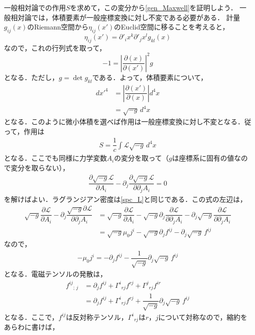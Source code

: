 \documentclass[a4paper]{ltjsreport}
\begin{document}
一般相対論での作用$S$を求めて，この変分から\eqref{gen_Maxwell}を証明しよう．
一般相対論では，体積要素が一般座標変換に対し不変である必要がある．
計量$g_{ij}(x)$のRiemann空間から$\eta_{ij}(x')$のEuclid空間に移ることを考えると，
\[
\eta_{ij}(x')=\partial'_i{x^k}\partial'_j{x^l}g_{kl}(x)
\]
なので，これの行列式を取って，
\[ - 1=\left|\dfrac{\partial(x)}{\partial(x')}\right|^2g\]
となる．ただし，$g=\det{g_{kl}}$である．よって，体積要素について，
\begin{align*}
  dx'^4 &= \left|\dfrac{\partial(x')}{\partial(x)}\right|d^4x\\
  &= \sqrt{ - g}\,d^4x
\end{align*}
となる．このように微小体積を選べば作用は一般座標変換に対し不変となる．従って，作用は
\begin{align}
  S = \dfrac{1}{c}\int{}\mathcal{L}\sqrt{ - g}\,d^4x
\end{align}
となる．ここでも同様に力学変数$A_i$の変分を取って（$g$は座標系に固有の値なので変分を取らない），
\begin{align}
  \dfrac{\partial{\sqrt{ - g}\mathcal{L}}}{\partial{}A_i} - \partial_j\dfrac{\partial{\sqrt{ - g}\mathcal{L}}}{\partial\partial_jA_i}=0
\end{align}
を解けばよい．ラグランジアン密度は\eqref{spc_L}と同じである．この式の左辺は，
\begin{align*}
  \sqrt{ - g}\dfrac{\partial{\mathcal{L}}}{\partial{}A_i} - \partial_j\dfrac{\sqrt{ - g}\partial{\mathcal{L}}}{\partial\partial_jA_i}
  &= \sqrt{ - g}\dfrac{\partial{\mathcal{L}}}{\partial{}A_i} - \sqrt{ - g}\partial_j\dfrac{\partial{\mathcal{L}}}{\partial\partial_jA_i}
   - \partial_j\sqrt{ - g}\dfrac{\partial{\mathcal{L}}}{\partial\partial_jA_i}\\
  &= \sqrt{ - g}\mu_0j^i - \sqrt{ - g}\partial_jf^{ij} - \partial_j\sqrt{ - g}\,f^{ij}
\end{align*}
なので，
\begin{align}
   - \mu_0j^i= - \partial_jf^{ij} - \dfrac{1}{\sqrt{ - g}}\partial_j\sqrt{ - g}\,f^{ij}\label{Sgen_Maxwell}
\end{align}
となる．電磁テンソルの発散は，
\begin{align*}
  {f^{ij}}_{;\,j} &= \partial_jf^{ij} + {\Gamma^i}_{rj}f^{rj} + {\Gamma^j}_{rj}f^{ir}\\
  &= \partial_jf^{ij} + {\Gamma^i}_{rj}f^{rj} + \dfrac{1}{\sqrt{ - g}}\partial_j\sqrt{ - g}\,f^{ij}
\end{align*}
となる．ここで，$f^{ij}$は反対称テンソル，${\Gamma^i}_{rj}$は$r$，$j$について対称なので，縮約をあらわに書けば，
\end{document}
